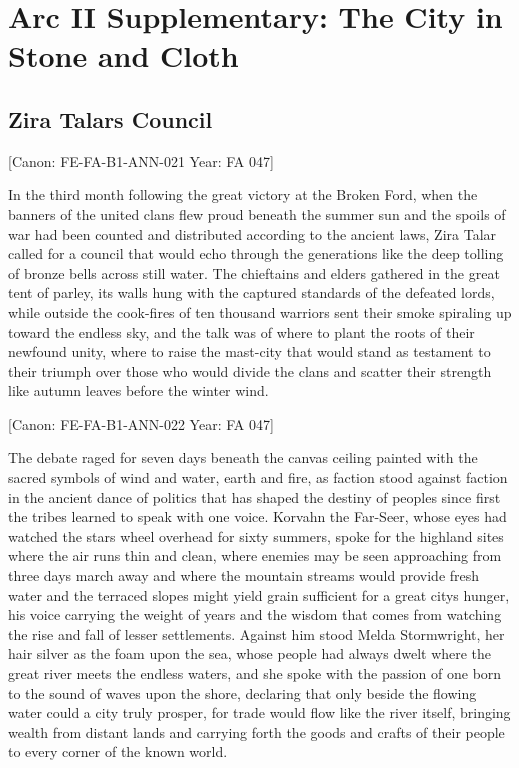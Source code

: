 \section{Arc II Supplementary: The City in Stone and
Cloth}\label{arc-ii-supplementary-the-city-in-stone-and-cloth}

\subsection{Zira Talar\textquotesingle s
Council}\label{zira-talars-council}

{[}Canon: FE-FA-B1-ANN-021 \textbar{} Year: FA 047{]}

In the third month following the great victory at the Broken Ford, when
the banners of the united clans flew proud beneath the summer sun and
the spoils of war had been counted and distributed according to the
ancient laws, Zira Talar called for a council that would echo through
the generations like the deep tolling of bronze bells across still
water. The chieftains and elders gathered in the great tent of parley,
its walls hung with the captured standards of the defeated lords, while
outside the cook-fires of ten thousand warriors sent their smoke
spiraling up toward the endless sky, and the talk was of where to plant
the roots of their newfound unity, where to raise the mast-city that
would stand as testament to their triumph over those who would divide
the clans and scatter their strength like autumn leaves before the
winter wind.

{[}Canon: FE-FA-B1-ANN-022 \textbar{} Year: FA 047{]}

The debate raged for seven days beneath the canvas ceiling painted with
the sacred symbols of wind and water, earth and fire, as faction stood
against faction in the ancient dance of politics that has shaped the
destiny of peoples since first the tribes learned to speak with one
voice. Korvahn the Far-Seer, whose eyes had watched the stars wheel
overhead for sixty summers, spoke for the highland sites where the air
runs thin and clean, where enemies may be seen approaching from three
days\textquotesingle{} march away and where the mountain streams would
provide fresh water and the terraced slopes might yield grain sufficient
for a great city\textquotesingle s hunger, his voice carrying the weight
of years and the wisdom that comes from watching the rise and fall of
lesser settlements. Against him stood Melda Stormwright, her hair silver
as the foam upon the sea, whose people had always dwelt where the great
river meets the endless waters, and she spoke with the passion of one
born to the sound of waves upon the shore, declaring that only beside
the flowing water could a city truly prosper, for trade would flow like
the river itself, bringing wealth from distant lands and carrying forth
the goods and crafts of their people to every corner of the known world.

